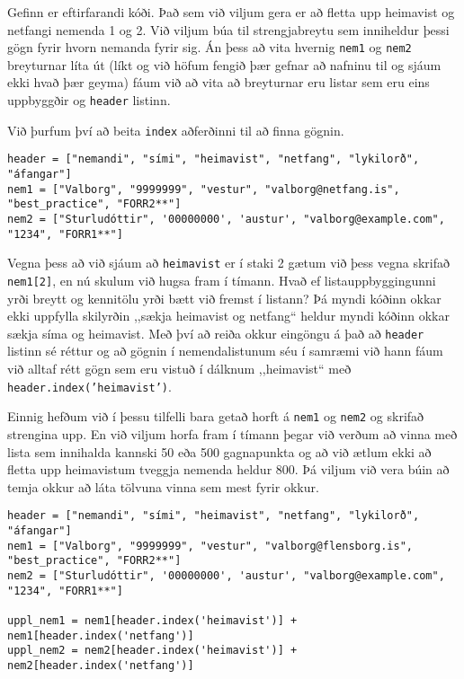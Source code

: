 \begin{exercise}\label{lst3}
Gefinn er eftirfarandi kóði.
Það sem við viljum gera er að fletta upp heimavist og netfangi nemenda 1 og 2.
Við viljum búa til strengjabreytu sem inniheldur þessi gögn fyrir hvorn nemanda fyrir sig.
Án þess að vita hvernig \texttt{nem1} og \texttt{nem2} breyturnar líta út (líkt og við höfum fengið þær gefnar að nafninu til og sjáum ekki hvað þær geyma) fáum við að vita að breyturnar eru listar sem eru eins uppbyggðir og \texttt{header} listinn.

Við þurfum því að beita \texttt{index} aðferðinni til að finna gögnin.
\begin{lstlisting}
header = ["nemandi", "sími", "heimavist", "netfang", "lykilorð", "áfangar"]
nem1 = ["Valborg", "9999999", "vestur", "valborg@netfang.is", "best_practice", "FORR2**"]
nem2 = ["Sturludóttir", '00000000', 'austur', "valborg@example.com", "1234", "FORR1**"]\end{lstlisting}

\end{exercise}
\begin{Answer}[ref={lst3}]
	Vegna þess að við sjáum að \texttt{heimavist} er í staki 2 gætum við þess vegna skrifað \texttt{nem1[2]}, en nú skulum við hugsa fram í tímann.
	Hvað ef listauppbyggingunni yrði breytt og kennitölu yrði bætt við fremst í listann?
	Þá myndi kóðinn okkar ekki uppfylla skilyrðin ,,sækja heimavist og netfang“ heldur myndi kóðinn okkar sækja síma og heimavist.
	Með því að reiða okkur eingöngu á það að \texttt{header} listinn sé réttur og að gögnin í nemendalistunum séu í samræmi við hann fáum við alltaf rétt gögn sem eru vistuð í dálknum ,,heimavist“ með \texttt{header.index('heimavist')}.


	Einnig hefðum við í þessu tilfelli bara getað horft á \texttt{nem1} og \texttt{nem2} og skrifað strengina upp.
	En við viljum horfa fram í tímann þegar við verðum að vinna með lista sem innihalda kannski 50 eða 500 gagnapunkta og að við ætlum ekki að fletta upp heimavistum tveggja nemenda heldur 800.
	Þá viljum við vera búin að temja okkur að láta tölvuna vinna sem mest fyrir okkur. 
\begin{lstlisting}
header = ["nemandi", "sími", "heimavist", "netfang", "lykilorð", "áfangar"]
nem1 = ["Valborg", "9999999", "vestur", "valborg@flensborg.is", "best_practice", "FORR2**"]
nem2 = ["Sturludóttir", '00000000', 'austur', "valborg@example.com", "1234", "FORR1**"]

uppl_nem1 = nem1[header.index('heimavist')] + nem1[header.index('netfang')]
uppl_nem2 = nem2[header.index('heimavist')] + nem2[header.index('netfang')]\end{lstlisting}
\newpage
\end{Answer}

